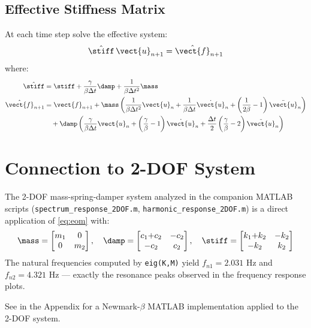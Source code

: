 \subsection{Effective Stiffness Matrix}

At each time step solve the effective system:
\begin{equation}
    \hat{\stiff}\,\vect{u}_{n+1} = \hat{\vect{f}}_{n+1}
    \label{eq:newmark_effective}
\end{equation}
where:
\begin{align}
    \hat{\stiff} &= \stiff + \frac{\gamma}{\beta\Delta t}\damp + \frac{1}{\beta\Delta t^2}\mass
    \label{eq:eff_K} \\
    \hat{\vect{f}}_{n+1} &= \vect{f}_{n+1}
    + \mass\left(\frac{1}{\beta\Delta t^2}\vect{u}_n
    + \frac{1}{\beta\Delta t}\dot{\vect{u}}_n
    + \left(\frac{1}{2\beta}-1\right)\ddot{\vect{u}}_n\right) \notag \\
    &\quad + \damp\left(\frac{\gamma}{\beta\Delta t}\vect{u}_n
    + \left(\frac{\gamma}{\beta}-1\right)\dot{\vect{u}}_n
    + \frac{\Delta t}{2}\left(\frac{\gamma}{\beta}-2\right)\ddot{\vect{u}}_n\right)
    \label{eq:eff_f}
\end{align}

\section{Connection to 2-DOF System}

The 2-DOF mass-spring-damper system analyzed in the companion MATLAB scripts
(\texttt{spectrum\_response\_2DOF.m}, \texttt{harmonic\_response\_2DOF.m}) is
a direct application of \cref{eq:eom} with:
\begin{equation*}
    \mass = \begin{bmatrix}m_1&0\\0&m_2\end{bmatrix}, \quad
    \damp = \begin{bmatrix}c_1{+}c_2&-c_2\\-c_2&c_2\end{bmatrix}, \quad
    \stiff = \begin{bmatrix}k_1{+}k_2&-k_2\\-k_2&k_2\end{bmatrix}
\end{equation*}
The natural frequencies computed by \texttt{eig(K,M)} yield
$f_{n1} = 2.031$ Hz and $f_{n2} = 4.321$ Hz — exactly the resonance peaks
observed in the frequency response plots.

\noindent See  in the Appendix for a Newmark-$\beta$
MATLAB implementation applied to the 2-DOF system.

